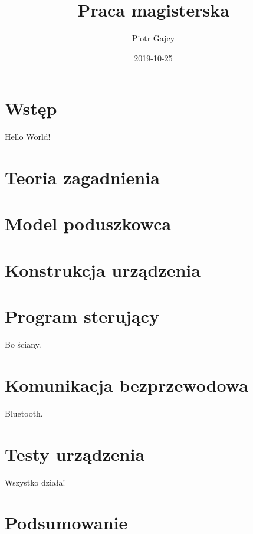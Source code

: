 \documentclass[a4paper, 12pt, twoside, openright]{report}
\begin{document}
\title{Praca magisterska}
\date{2019-10-25}
\author{Piotr Gajcy}

  \maketitle
  \newpage
  \tableofcontents
  \newpage
  
\chapter*{Wstęp}
Hello World!

\chapter{Teoria zagadnienia}
 
\chapter{Model poduszkowca}

\chapter{Konstrukcja urządzenia}

\chapter{Program sterujący}
Bo ściany.
\chapter{Komunikacja bezprzewodowa}
Bluetooth.
\chapter{Testy urządzenia}
Wszystko działa!
\chapter*{Podsumowanie}


\listoffigures
\listoftables



\end{document}
